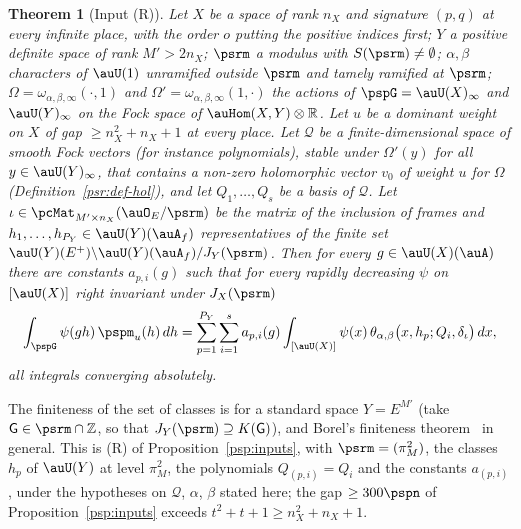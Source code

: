 \documentclass[10pt]{amsart}
\newtheorem{theorem}{Theorem}[section]
\theoremstyle{definition}
\theoremstyle{remark}
\newcommand{\R}{\mathbb R}
\newcommand{\Z}{\mathbb Z}
\begin{document}
\begin{theorem}[Input (R)]\label{psr:R}
Let $X$ be a space of rank $n_X$ and signature $(p,q)$ at every infinite place, with the order $o$
putting the positive indices first; $Y$ a positive definite space of rank $M'>2n_X$; $\psrm$ a modulus
with $S(\psrm)\ne\emptyset$; $\alpha,\beta$ characters of $\auU(1)$ unramified outside $\psrm$ and tamely
ramified at $\psrm$; $\Omega=\omega_{\alpha,\beta,\infty}(\cdot,1)$ and $\Omega'=\omega_{\alpha,\beta,\infty}(1,
\cdot)$ the actions of $\pspG=\auU(X)_\infty$ and $\auU(Y)_\infty$ on the Fock space of $\auHom(X,Y)
\otimes\R$. Let $u$ be a dominant weight on $X$ of gap $\ge n_X^2+n_X+1$ at every place. Let $\mathcal Q$
be a finite-dimensional space of smooth Fock vectors \textup{(}for instance polynomials\textup{)}, stable
under $\Omega'(y)$ for all $y\in\auU(Y)_\infty$, that contains a non-zero holomorphic vector $v_0$ of
weight $u$ for $\Omega$ \textup{(}Definition~\ref{psr:def-hol}\textup{)}, and let $Q_1,\dots,Q_s$ be a
basis of $\mathcal Q$. Let $\iota\in\pcMat_{M'\times n_X}(\auO_E/\psrm)$ be the matrix of the inclusion of
frames and $h_1,\dots,h_{P_Y}\in\auU(Y)(\auA_f)$ representatives of the finite set
$\auU(Y)(E^+)\backslash\auU(Y)(\auA_f)/J_Y(\psrm)$. Then for every $g\in\auU(X)(\auA)$ there are
constants $a_{p,i}(g)$ such that for every rapidly decreasing $\psi$ on $[\auU(X)]$ right invariant
under $J_X(\psrm)$
\[
\int_{\pspG}\psi(gh)\,\pspm_u(h)\,dh=\sum_{p=1}^{P_Y}\sum_{i=1}^sa_{p,i}(g)\int_{[\auU(X)]}\psi(x)\,
\theta_{\alpha,\beta}\bigl(x,h_p;Q_i,\delta_\iota\bigr)\,dx ,
\]
all integrals converging absolutely.
\end{theorem}

The finiteness of the set of classes is {\cite[Proposition~7.20]{P49}} for a standard space $Y=E^{M'}$
(take $\mathsf G\in\psrm\cap\Z$, so that $J_Y(\psrm)\supseteq K(\mathsf G)$), and Borel's finiteness
theorem~\cite[Theorem~5.1]{BorelFin} in general. This is (R) of Proposition~\ref{psp:inputs},
with $\psrm=(\pi_M^2)$, the classes $h_p$ of $\auU(Y)$ at level $\pi_M^2$, the polynomials
$Q_{(p,i)}=Q_i$ and the constants $a_{(p,i)}$, under the hypotheses on $\mathcal Q$, $\alpha$, $\beta$ stated
here; the gap $\ge300\pspn$ of Proposition~\ref{psp:inputs} exceeds $t^2+t+1\ge n_X^2+n_X+1$.
\end{document}
